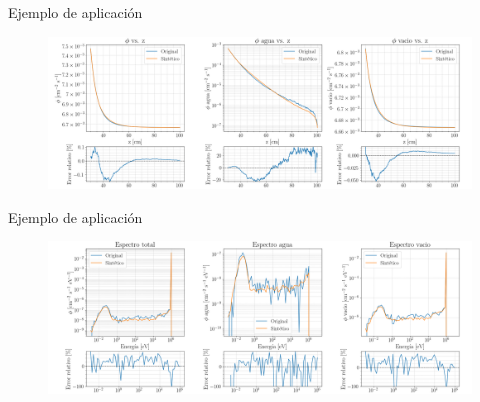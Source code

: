 \documentclass[aspectratio=169,english]{beamer}
\begin{document}
\begin{frame}{Ejemplo de aplicación}
    \begin{figure}
        \centering
        \includegraphics[width=1\linewidth]{imagens/resultados_flujo.png}
        \label{fig:flujos.png}
    \end{figure}
    

\end{frame}

\begin{frame}{Ejemplo de aplicación}
    
    \begin{figure}
        \centering
        \includegraphics[width=1\linewidth]{imagens/resultados_espectro.png}
        \label{fig:espectros.png}
    \end{figure}

\end{frame}

\end{document}
